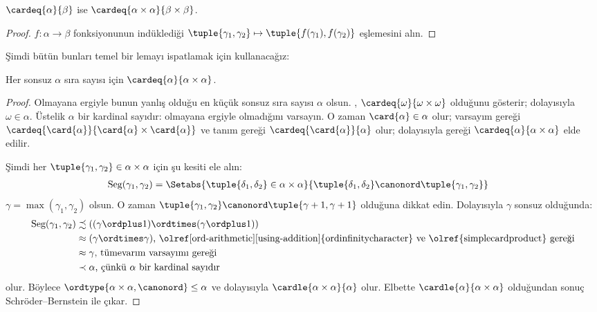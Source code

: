 \begin{prop}
$\cardeq{\alpha}{\beta}$ ise
$\cardeq{\alpha \times \alpha}{\beta \times \beta}$.
\end{prop}

\begin{proof}
$f\colon\alpha\to\beta$ fonksiyonunun indüklediği
$\tuple{\gamma_1,\gamma_2}\mapsto
\tuple{f(\gamma_1),f(\gamma_2)}$ eşlemesini alın.
\end{proof}
\noindent
Şimdi bütün bunları temel bir lemayı ispatlamak için kullanacağız:
\begin{lem}
Her sonsuz $\alpha$ sıra sayısı için
$\cardeq{\alpha}{\alpha\times\alpha}$.
\end{lem}

\begin{proof}
Olmayana ergiyle bunun yanlış olduğu en küçük sonsuz sıra sayısı $\alpha$
olsun. ,
$\cardeq{\omega}{\omega\times\omega}$ olduğunu gösterir; dolayısıyla
$\omega\in\alpha$. Üstelik $\alpha$ bir kardinal sayıdır: olmayana
ergiyle olmadığını varsayın. O zaman $\card{\alpha}\in\alpha$ olur;
varsayım gereği
$\cardeq{\card{\alpha}}{\card{\alpha}\times\card{\alpha}}$ ve tanım
gereği $\cardeq{\card{\alpha}}{\alpha}$ olur; dolayısıyla
 gereği
$\cardeq{\alpha}{\alpha\times\alpha}$ elde edilir.

Şimdi her $\tuple{\gamma_1,\gamma_2}\in\alpha\times\alpha$ için şu
kesiti ele alın:
\begin{align*}
	\text{Seg}(\gamma_1, \gamma_2) &= \Setabs{\tuple{\delta_1, \delta_2} \in \alpha \times \alpha}{\tuple{\delta_1, \delta_2} \canonord \tuple{\gamma_1, \gamma_2}}
\end{align*}
$\gamma=\max(\gamma_1,\gamma_2)$ olsun. O zaman
$\tuple{\gamma_1,\gamma_2}\canonord
\tuple{\gamma+1,\gamma+1}$ olduğuna dikkat edin. Dolayısıyla $\gamma$
sonsuz olduğunda:
\begin{align*}
	\text{Seg}(\gamma_1, \gamma_2) &
	\precsim ((\gamma \ordplus 1)\ordtimes (\gamma \ordplus 1))\\
	&\approx (\gamma \ordtimes \gamma)
	\text{, \olref[ord-arithmetic][using-addition]{ordinfinitycharacter} ve
	\olref{simplecardproduct} gereği}\\
	&\approx \gamma \text{, tümevarım varsayımı gereği}\\
	& \prec \alpha\text{, çünkü $\alpha$ bir kardinal sayıdır}
\end{align*}
olur. Böylece $\ordtype{\alpha\times\alpha,\canonord}\leq\alpha$ ve
dolayısıyla $\cardle{\alpha\times\alpha}{\alpha}$ olur. Elbette
$\cardle{\alpha}{\alpha\times\alpha}$ olduğundan sonuç
Schröder--Bernstein ile çıkar.
\end{proof}

